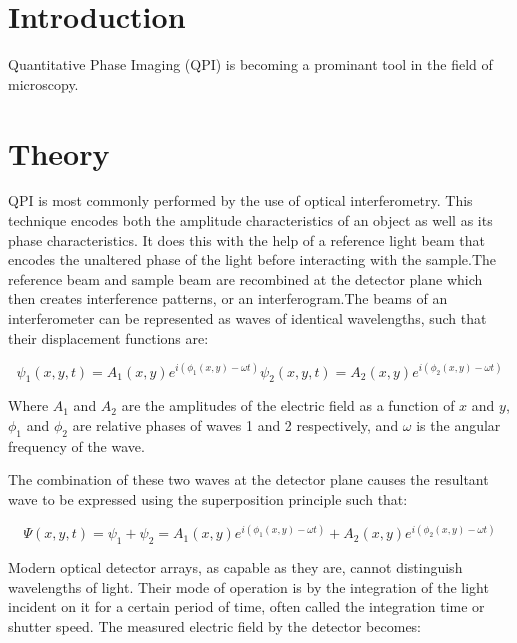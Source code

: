 \documentclass[10pt,letterpaper]{article}
\begin{document}
\section{Introduction}
Quantitative Phase Imaging (QPI) is becoming a prominant tool in the field of microscopy. 

\section{Theory}
QPI is most commonly performed by the use of optical interferometry. This technique encodes both the amplitude characteristics of an object as well as its phase characteristics. It does this with the help of a reference light beam that encodes the unaltered phase of the light before interacting with the sample.The reference beam and sample beam are recombined at the detector plane which then creates interference patterns, or an interferogram.The beams of an interferometer can be represented as waves of identical wavelengths, such that their displacement functions are:

\begin{subequations}
\begin{equation}
 \psi_1(x,y,t)=A_1(x,y)e^{i(\phi_1(x,y)-\omega t)}
 \end{equation}
 \begin{equation}
 \psi_2(x,y,t)=A_2(x,y)e^{i(\phi_2(x,y)-\omega t)}
 \end{equation}
 \end{subequations}
 
 Where $A_1$ and $A_2$ are the amplitudes of the electric field as a function of $x$ and $y$, $\phi_1$ and $\phi_2$ are relative phases of waves 1 and 2 respectively, and $\omega$ is the angular frequency of the wave. 
 
 The combination of these two waves at the detector plane causes the resultant wave to be expressed using the superposition principle such that:
 
 \begin{equation}
 \Psi(x,y,t)=\psi_1+\psi_2=A_1(x,y)e^{i(\phi_1(x,y)-\omega t)}+A_2(x,y)e^{i(\phi_2(x,y)-\omega t)}
 \end{equation}
 
 Modern optical detector arrays, as capable as they are, cannot distinguish wavelengths of light. Their mode of operation is by the integration of the light incident on it for a certain period of time, often called the integration time or shutter speed. The measured electric field by the detector becomes:
 
\end{document}
